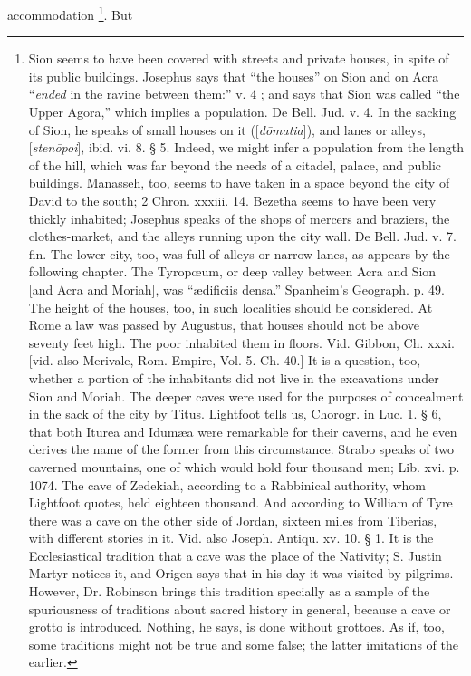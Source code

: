 accommodation \footnote{Sion seems to have been covered with streets and private houses, in
spite of its public buildings. Josephus says that ``the houses'' on Sion
and on Acra ``\emph{ended} in the ravine between them:'' v. 4 ; and says
that Sion was called ``the Upper Agora,'' which implies a population. De
Bell. Jud. v. 4. In the sacking of Sion, he speaks of small houses on
it ([\emph{d\={o}matia}]), and lanes or alleys, [\emph{sten\={o}poi}],
ibid. vi. 8. § 5. Indeed, we might infer a population from the length
of the hill, which was far beyond the needs of a citadel, palace, and
public buildings. Manasseh, too, seems to have taken in a space beyond
the city of David to the south; 2 Chron. xxxiii. 14. Bezetha seems to
have been very thickly inhabited; Josephus speaks of the shops of
mercers and braziers, the clothes-market, and the alleys running upon
the city wall. De Bell. Jud. v. 7. fin. The lower city, too, was full
of alleys or narrow lanes, as appears by the following chapter. The
Tyropœum, or deep valley between Acra and Sion [and Acra and Moriah],
was ``ædificiis densa.'' Spanheim's Geograph. p. 49. The height of the
houses, too, in such localities should be considered. At Rome a law
was passed by Augustus, that houses should not be above seventy feet
high. The poor inhabited them in floors. Vid. Gibbon, Ch. xxxi. [vid.
also Merivale, Rom. Empire, Vol. 5. Ch. 40.] It is a question, too,
whether a portion of the inhabitants did not live in the excavations
under Sion and Moriah. The deeper caves were used for the purposes of
concealment in the sack of the city by Titus. Lightfoot tells us,
Chorogr. in Luc. 1. § 6, that both Iturea and Idumæa were remarkable
for their caverns, and he even derives the name of the former from
this circumstance. Strabo speaks of two caverned mountains, one of
which would hold four thousand men; Lib. xvi. p. 1074. The cave of
Zedekiah, according to a Rabbinical authority, whom Lightfoot quotes,
held eighteen thousand. And according to William of Tyre there was a
cave on the other side of Jordan, sixteen miles from Tiberias, with
different stories in it. Vid. also Joseph. Antiqu. xv. 10. § 1. It is
the Ecclesiastical tradition that a cave was the place of the
Nativity; S. Justin Martyr notices it, and Origen says that in his day
it was visited by pilgrims. However, Dr. Robinson brings this
tradition specially as a sample of the spuriousness of traditions
about sacred history in general, because a cave or grotto is
introduced. Nothing, he says, is done without grottoes. As if, too,
some traditions might not be true and some false; the latter
imitations of the earlier.}. But
